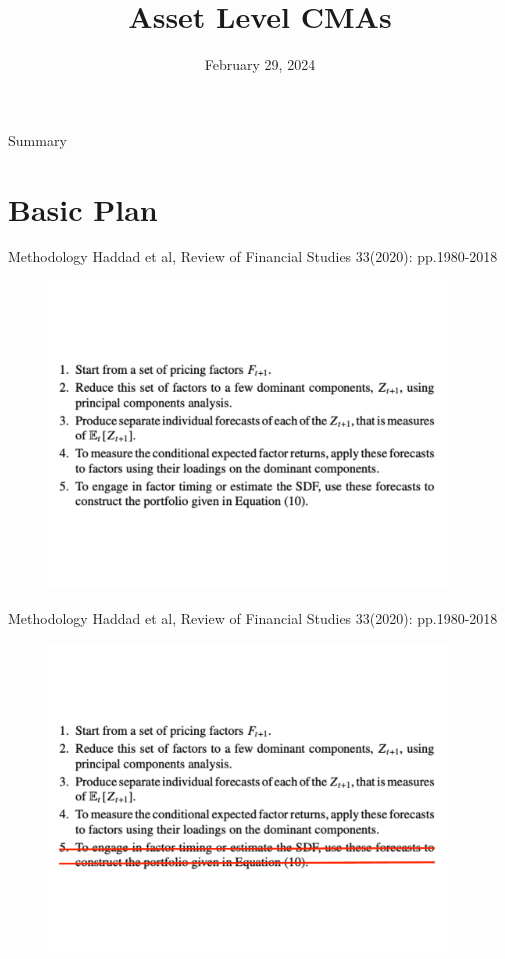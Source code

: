 \documentclass[dvipsnames,mathserif, handout]{beamer}
\begin{document}
\rightskip\rightmargin
\title{Asset Level CMAs}
\author{ \Large \textbf{} }
\footnotesize{\date{February 29, 2024 }


\begin{frame}
	\maketitle
\end{frame}

\begin{frame}{Summary}
	\footnotesize \tableofcontents
\end{frame}

\section{Basic Plan}

\begin{frame}{Methodology}
	Haddad et al, Review of Financial Studies 33(2020): pp.1980-2018 
	\begin{figure}[!ht]
		\includegraphics[width=300pt]{Steps_orig.pdf}
	\end{figure}
\end{frame}

\begin{frame}{Methodology}
	Haddad et al, Review of Financial Studies 33(2020): pp.1980-2018 
	\begin{figure}[!ht]
		\includegraphics[width=300pt]{Steps_canceled.pdf}
	\end{figure}
\end{frame}

}
\end{document}
